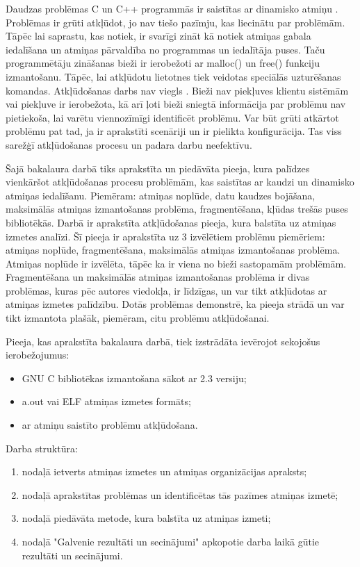 ﻿Daudzas problēmas C un C++ programmās ir saistītas ar dinamisko atmiņu \cite{TFM}.
Problēmas ir grūti atkļūdot, jo nav tiešo pazīmju, kas liecinātu par problēmām.
Tāpēc lai saprastu, kas notiek, ir svarīgi zināt kā notiek atmiņas gabala iedalīšana un atmiņas pārvaldība no programmas un iedalītāja puses.
Taču programmētāju zināšanas bieži ir ierobežoti ar malloc() un free() funkciju izmantošanu. 
Tāpēc, lai atkļūdotu lietotnes tiek veidotas speciālās uzturēšanas komandas.
Atkļūdošanas darbs nav viegls \cite{ER}. Bieži nav piekļuves klientu sistēmām vai piekļuve ir ierobežota, kā arī ļoti bieži sniegtā informācija par problēmu nav pietiekoša, lai varētu viennozīmīgi identificēt problēmu.
Var būt grūti atkārtot problēmu pat tad, ja ir aprakstīti scenāriji un ir pielikta konfigurācija.
Tas viss sarežģī atkļūdošanas procesu un padara darbu neefektīvu.

Šajā bakalaura darbā tiks aprakstīta un piedāvāta pieeja, kura palīdzes vienkāršot atkļūdošanas procesu problēmām, kas saistītas ar kaudzi un dinamisko atmiņas iedalīšanu.
Piemēram: atmiņas noplūde, datu kaudzes bojāšana, maksimālās atmiņas izmantošanas problēma, fragmentēšana, kļūdas trešās puses bibliotēkās.
Darbā ir aprakstīta atkļūdošanas pieeja, kura balstīta uz atmiņas izmetes analīzi.
Šī pieeja ir aprakstīta uz 3 izvēlētiem problēmu piemēriem: atmiņas noplūde, fragmentēšana, maksimālās atmiņas izmantošanas problēma.
Atmiņas noplūde ir izvēlēta, tāpēc ka ir viena no bieži sastopamām problēmām.
Fragmentēšana un maksimālās atmiņas izmantošanas problēma ir divas problēmas, kuras pēc autores viedokļa, ir līdzīgas, un var tikt atkļūdotas ar atmiņas izmetes palīdzību.
Dotās problēmas demonstrē, ka pieeja strādā un var tikt izmantota plašāk, piemēram, citu problēmu atkļūdošanai.

Pieeja, kas aprakstīta bakalaura darbā, tiek izstrādāta ievērojot sekojošus ierobežojumus:
\begin{itemize}
	\item GNU C bibliotēkas izmantošana sākot ar 2.3 versiju;
    \item a.out vai ELF atmiņas izmetes formāts;
    \item ar atmiņu saistīto problēmu atkļūdošana.
\end{itemize} 

Darba struktūra:
\begin{enumerate}
    \item   nodaļā ietverts atmiņas izmetes un atmiņas organizācijas apraksts;
    \item   nodaļā aprakstītas problēmas un identificētas tās pazīmes atmiņas izmetē;
    \item   nodaļā piedāvāta metode, kura balstīta uz atmiņas izmeti;
    \item   nodaļā "Galvenie rezultāti un secinājumi" apkopotie darba laikā gūtie rezultāti un secinājumi.
\end{enumerate} 
